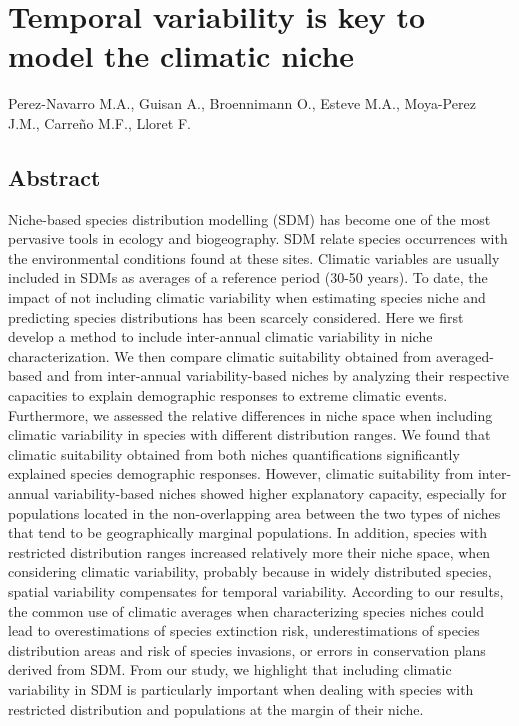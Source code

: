 \documentclass[11pt,twoside]{reedthesis}
\begin{document}
\chapter[Temporal variability is key to model the climatic niche]{Temporal variability is key to model the climatic niche}

\setlength{\parskip}{0.2cm plus4mm minus3mm} \setlength{\parindent}{0pt}
Perez-Navarro M.A., Guisan A., Broennimann O., Esteve M.A., Moya-Perez
J.M., Carreño M.F., Lloret F. \newpage
\setlength{\parindent}{30pt}

\section*{Abstract}

Niche-based species distribution modelling (SDM) has become one of the
most pervasive tools in ecology and biogeography. SDM relate species
occurrences with the environmental conditions found at these sites.
Climatic variables are usually included in SDMs as averages of a
reference period (30-50 years). To date, the impact of not including
climatic variability when estimating species niche and predicting
species distributions has been scarcely considered. Here we first
develop a method to include inter-annual climatic variability in niche
characterization. We then compare climatic suitability obtained from
averaged-based and from inter-annual variability-based niches by
analyzing their respective capacities to explain demographic responses
to extreme climatic events. Furthermore, we assessed the relative
differences in niche space when including climatic variability in
species with different distribution ranges. We found that climatic
suitability obtained from both niches quantifications significantly
explained species demographic responses. However, climatic suitability
from inter-annual variability-based niches showed higher explanatory
capacity, especially for populations located in the non-overlapping area
between the two types of niches that tend to be geographically marginal
populations. In addition, species with restricted distribution ranges
increased relatively more their niche space, when considering climatic
variability, probably because in widely distributed species, spatial
variability compensates for temporal variability. According to our
results, the common use of climatic averages when characterizing species
niches could lead to overestimations of species extinction risk,
underestimations of species distribution areas and risk of species
invasions, or errors in conservation plans derived from SDM. From our
study, we highlight that including climatic variability in SDM is
particularly important when dealing with species with restricted
distribution and populations at the margin of their niche.\par
\end{document}
